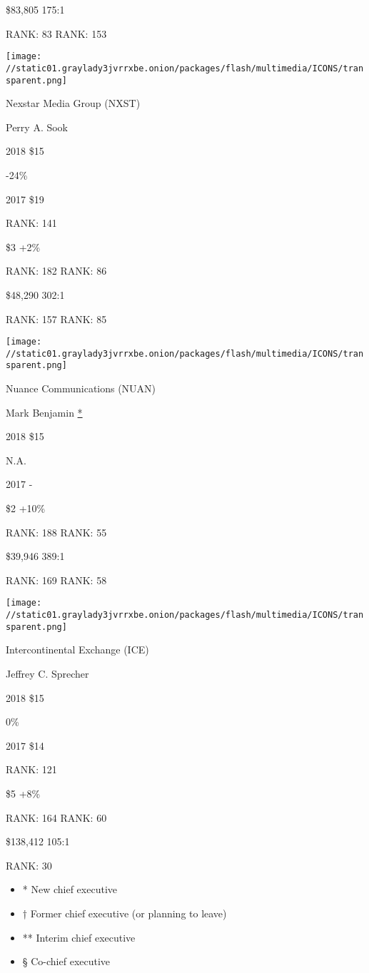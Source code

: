  \$83,805 175:1

RANK: 83 RANK: 153

\texttt{[image: //static01.graylady3jvrrxbe.onion/packages/flash/multimedia/ICONS/transparent.png]}

Nexstar Media Group (NXST)

Perry A. Sook \protect\hyperlink{g-footnotes}{}

2018 \$15

 -24\%

2017 \$19

RANK: 141

 \$3 +2\%

RANK: 182 RANK: 86

 \$48,290 302:1

RANK: 157 RANK: 85

\texttt{[image: //static01.graylady3jvrrxbe.onion/packages/flash/multimedia/ICONS/transparent.png]}

Nuance Communications (NUAN)

Mark Benjamin \protect\hyperlink{g-footnotes}{*}

2018 \$15

 N.A.

2017 -

 \$2 +10\%

RANK: 188 RANK: 55

 \$39,946 389:1

RANK: 169 RANK: 58

\texttt{[image: //static01.graylady3jvrrxbe.onion/packages/flash/multimedia/ICONS/transparent.png]}

Intercontinental Exchange (ICE)

Jeffrey C. Sprecher \protect\hyperlink{g-footnotes}{}

2018 \$15

 0\%

2017 \$14

RANK: 121

 \$5 +8\%

RANK: 164 RANK: 60

 \$138,412 105:1

RANK: 30

\begin{itemize}
\tightlist
\item
  * New chief executive
\item
  † Former chief executive (or planning to leave)
\item
  ** Interim chief executive
\item
  § Co-chief executive
\end{itemize}

